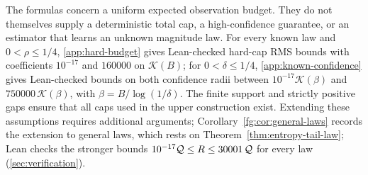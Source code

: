 The formulas concern a uniform expected observation budget.
They do not themselves supply a deterministic total cap, a
high-confidence guarantee, or an estimator that learns an unknown
magnitude law. For every known law and $0<\rho\le1/4$,
\cref{app:hard-budget} gives Lean-checked hard-cap RMS bounds with
coefficients $10^{-17}$ and $160000$ on $\mathcal K(B)$; for
$0<\delta\le1/4$, \cref{app:known-confidence} gives Lean-checked
bounds on both confidence radii between $10^{-17}\mathcal K(\beta)$ and
$750000\,\mathcal K(\beta)$, with $\beta=B/\log(1/\delta)$.
The finite support and strictly positive gaps ensure that all
caps used in the upper construction exist. Extending these
assumptions requires additional arguments; Corollary~\ref{fg:cor:general-laws}
records the extension to general laws, which rests on
Theorem~\ref{thm:entropy-tail-law}; Lean checks the stronger bounds
$10^{-17}\mathcal Q\le R\le30001\,\mathcal Q$ for every law (\cref{sec:verification}).

